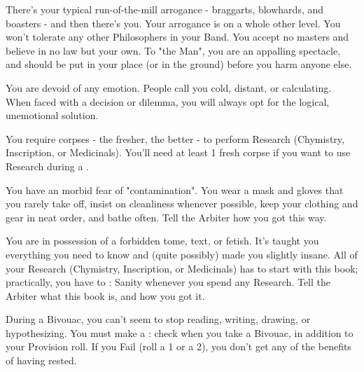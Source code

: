 
  There's your typical run-of-the-mill arrogance - braggarts, blowhards, and boasters - and then there's you.  Your arrogance is on a whole other level.  You won't tolerate any other Philosophers in your Band.  You accept no masters and believe in no law but your own. To "the Man", you are an appalling spectacle, and should be put in your place (or in the ground) before you harm anyone else.


  You are devoid of any emotion.  People call you cold, distant, or calculating.  When faced with a decision or dilemma, you will always opt for the logical, unemotional solution.


  You require corpses - the fresher, the better - to perform Research (Chymistry, Inscription, or Medicinals).  You'll need at least 1 fresh corpse if you want to use Research during a . 


  You have an morbid fear of "contamination".  You wear a mask and gloves that you rarely take off, insist on cleanliness whenever possible, keep your clothing and gear in neat order, and bathe often. Tell the Arbiter how you got this way.


  You are in possession of a forbidden tome, text, or fetish.  It's taught you everything you need to know and (quite possibly) made you slightly insane.  All of your Research (Chymistry, Inscription, or Medicinals) has to start with this book; practically, you have to \RS: Sanity whenever you spend any Research.  Tell the Arbiter what this book is, and how you got it.


  During a Bivouac, you can't seem to stop reading, writing, drawing, or hypothesizing.  You must make a \RS: \FOC check when you take a Bivouac, in addition to your Provision roll.  If you Fail (roll a 1 or a 2), you don't get any of the benefits of having rested.


